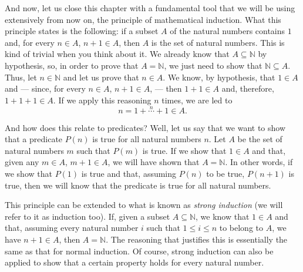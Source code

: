 \begin{para}
And now, let us close this chapter with a fundamental tool that we will be using extensively from now on, the principle of mathematical induction.
What this principle states is the following: if a subset $A$ of the natural numbers contains $1$ and, for every $n \in A$, $n+1 \in A$, then $A$ is the set of natural numbers.
This is kind of trivial when you think about it.
We already know that $A \subseteq \mathbb{N}$ by hypothesis, so, in order to prove that $A = \mathbb{N}$, we just need to show that $\mathbb{N} \subseteq A$.
Thus, let $n\in\mathbb{N}$ and let us prove that $n\in A$.
We know, by hypothesis, that $1 \in A$ and --- since, for every $n\in A$, $n+1\in A$, --- then $1 + 1 \in A$ and, therefore, $1 + 1 + 1 \in A$. If we apply this reasoning $n$ times, we are led to
\[ n = 1 + \overset{n}{\cdots} + 1 \in A.\]

And how does this relate to predicates?
Well, let us say that we want to show that a predicate $P(n)$ is true for all natural numbers $n$.
Let $A$ be the set of natural numbers $m$ such that $P(m)$ is true.
If we show that $1 \in A$ and that, given any $m\in A$, $m+1 \in A$, we will have shown that $A = \mathbb{N}$.
In other words, if we show that $P(1)$ is true and that, assuming $P(n)$ to be true, $P(n+1)$ is true, then we will know that the predicate is true for all natural numbers.

This principle can be extended to what is known as \emph{strong induction} (we will refer to it as induction too).
If, given a subset $A\subseteq \mathbb{N}$, we know that $1\in A$ and that, assuming every natural number $i$ such that $1\leq i \leq n$ to belong to $A$, we have $n+1 \in A$, then $A = \mathbb{N}$.
The reasoning that justifies this is essentially the same as that for normal induction.
Of course, strong induction can also be applied to show that a certain property holds for every natural number.
\end{para}
